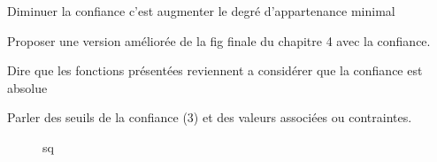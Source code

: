 Diminuer la confiance c'est augmenter le degré d'appartenance minimal

Proposer une version améliorée de la fig finale du chapitre 4 avec la
confiance.

Dire que les fonctions présentées reviennent a considérer que la
confiance est absolue

Parler des seuils de la confiance (3) et des valeurs associées ou
contraintes.


\begin{figure}
  \centering
  
  \caption{sq}
  \label{fig:qs}
\end{figure}




\begin{figure}
  \centering
\end{figure}




